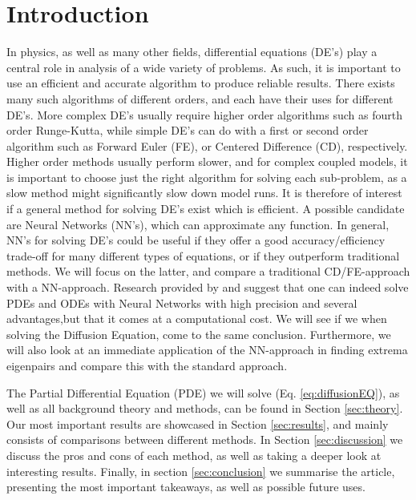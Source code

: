 \section{Introduction}
\label{sec:introduction}
In physics, as well as many other fields, differential equations (DE's) play a central role in analysis of a wide variety of problems. As such, it is important to use an efficient and accurate algorithm to produce reliable results. There exists many such algorithms of different orders, and each have their uses for different DE's. More complex DE's usually require higher order algorithms such as fourth order Runge-Kutta, while simple DE's can do with a first or second order algorithm such as Forward Euler (FE), or Centered Difference (CD), respectively. Higher order methods usually perform slower, and for complex coupled models, it is important to choose just the right algorithm for solving each sub-problem, as a slow method might significantly slow down model runs. It is therefore of interest if a general method for solving DE's exist which is efficient. A possible candidate are Neural Networks (NN's), which can approximate any function. In general, NN's for solving DE's could be useful if they offer a good accuracy/efficiency trade-off for many different types of equations, or if they outperform traditional methods. We will focus on the latter, and compare a traditional CD/FE-approach with a NN-approach. Research provided by \cite{lagaris1998artificial} and \cite{chiaramonte2013solving} suggest that one can indeed solve PDEs and ODEs with Neural Networks with high precision and several advantages,but that it comes at a computational cost. We will see if we when solving the Diffusion Equation, come to the same conclusion. Furthermore, we will also look at an immediate application of the NN-approach in finding extrema eigenpairs \citep{yi2004neural} and compare this with the standard approach.

The Partial Differential Equation (PDE) we will solve (Eq. \ref{eq:diffusionEQ}), as well as all background theory and methods, can be found in Section \ref{sec:theory}. Our most important results are showcased in Section \ref{sec:results}, and mainly consists of comparisons between different methods. In Section \ref{sec:discussion} we discuss the pros and cons of each method, as well as taking a deeper look at interesting results. Finally, in section \ref{sec:conclusion} we summarise the article, presenting the most important takeaways, as well as possible future uses.
